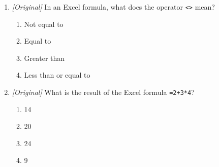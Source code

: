 \begin{enumerate}[label=\textbf{Q\arabic*.}, leftmargin=*]
\begin{enumerate}[label=\Roman*.]
      formula by Excel.
    \item An absolute reference such as \texttt{\$A\$1} does not change when
      the formula is copied.
    \item A relative reference such as \texttt{A1} changes when the formula is
      copied.
  \end{enumerate}
  \begin{enumerate}[label=\Alph*.]
    \item I only
    \item II and III only
    \item I and II only
    \item I, II, and III
  \end{enumerate}
\item \textit{[Original]} In an Excel formula, what does the operator
  \texttt{<>} mean?
  \begin{enumerate}[label=\Alph*.]
    \item Not equal to
    \item Equal to
    \item Greater than
    \item Less than or equal to
  \end{enumerate}
\item \textit{[Original]} What is the result of the Excel formula
  \texttt{=2+3*4}?
  \begin{enumerate}[label=\Alph*.]
    \item 14
    \item 20
    \item 24
    \item 9
  \end{enumerate}


\end{enumerate}
